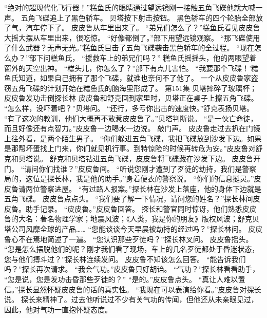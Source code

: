 \documentclass[a4paper,12pt,UTF8,twoside]{ctexbook}
\begin{document}
        “绝对的超现代化飞行器！”糕鱼氏的眼睛通过望远镜刚一接触五角飞碟他就大喊一声。 
        五角飞碟追上了黑色轿车。 
        贝塔按下射击按钮。 
        黑色轿车的四个轮胎全部放了气，汽车停下了。 
        皮皮鲁从车里出来了。 
        “弟兄们怎么了？”糕鱼氏看见皮皮鲁大摇大摆从车里出来，很吃惊。 
        “好像都倒了。”部下用望远镜观察。 
        “那飞碟使用了什么武器？无声无光。”糕鱼氏目击了五角飞碟袭击黑色轿车的全过程。 
        “现在怎么办？”部下问糕鱼氏，  “援救车上的弟兄们吗？” 
        糕鱼氏摇摇头，他的两眼望着窗外的天空出神。 
        “糕头儿，你怎么了？”部下有点儿害怕。 
        “我要那个飞碟！’糕鱼氏知道，如果自己拥有了那个飞碟，就谁也奈何不了他了。 
        一个从皮皮鲁家盗窃五角飞碟的计划开始在糕鱼氏的脑海里形成了。   第151集 
        贝塔摔碎了玻璃杯； 
        皮皮鲁发功击倒探长林   
        皮皮鲁和舒克回到家里时，贝塔正在桌子上擦五角飞碟。 
        “怎么样，没吓着吧？”贝塔问。 
        “还行，多亏你出击的速度快。”舒克表扬贝塔。 
        “有了这次的教训，他们大概再不敢惹皮皮鲁了。”贝塔判断说。 
        “是一伙亡命徒，而且好像还有点智力。”皮皮鲁一边喝水一边说。 
        敲门声。 
        皮皮鲁走过去扒在门镜上往外看，是两个陌生男子。 
        “你们躲进五角飞碟，我把飞碟放到沙发下边。如果是那帮坏蛋找上门来，你们就见机行事。到特惊险的时候再转危为安。”皮皮鲁对舒克和贝塔说。 
        舒克和贝塔钻进五角飞碟，皮皮鲁将飞碟藏在沙发下边。 
        皮皮鲁开门。 
        “请问你们找谁？”皮皮鲁间。 
        “听说您刚才遭到了歹徒的劫持，我们是警察局的，这位是探长林，我是他的助手。”身着便衣的警察说。 
        “你们的信息挺灵。”皮皮鲁请两位警察进屋。 
        “有过路人报案。”探长林在沙发上落座，他的身体下边就是五角飞碟。 
        皮皮鲁点点头。 
        “我们要了解一下情况，请问您的姓名？”探长林间皮皮鲁。助手记录。 
        “皮皮鲁。”皮皮鲁回答。 
        探长和警官同时惊讶，他们熟悉皮皮鲁的大名：著名物理学家；地震风波；《人类，我是你的朋友》版权风波；舒克贝塔公司风靡全球的产品…… 
        “您能谈谈今天早晨被劫持的经过吗？”探长林问。 
        皮皮鲁心不在焉地简述了一遍。 
        “您认识那些歹徒吗？”探长林叉问。 
        皮皮鲁摇头。 
        “您是怎么摆脱他们的呢？刚才我们看了现场，车上的几名歹徒都处于昏迷状态，您与他们搏斗过？”探长林连续发问。 
        皮皮鲁不知该怎么回答。 
        “能告诉我们吗？”探长再次请求。 
        “我会气功。”皮皮鲁只好胡诌。 
        “气功？”探长林看看助手，  “您是说，您是发功击昏那些歹徒的？” 
        “是的。”皮皮鲁点头。 
        “真让人难以置信。”探长显然怀疑皮皮鲁的话的真实性。 
        “我现在可以表演给你看。”皮皮鲁对探长说。 
        探长来精神了。过去他听说过不少有关气功的传闻，但他还从未亲眼见过，因此，他对气功一直抱怀疑态度。 
\end{document}
